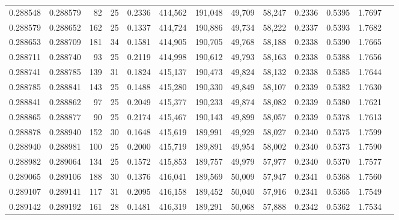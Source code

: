 \begin{tabular}{rrrrrrrrrrrrr}
0.288548 & 0.288579 &    82 &  25 &                                     0.2336 & 414,562 & 191,048 &  49,709 &  58,247 & 0.2336 & 0.5395 & 1.7697 \\
0.288579 & 0.288652 &   162 &  25 &                                     0.1337 & 414,724 & 190,886 &  49,734 &  58,222 & 0.2337 & 0.5393 & 1.7682 \\
0.288653 & 0.288709 &   181 &  34 &                                     0.1581 & 414,905 & 190,705 &  49,768 &  58,188 & 0.2338 & 0.5390 & 1.7665 \\
0.288711 & 0.288740 &    93 &  25 &                                     0.2119 & 414,998 & 190,612 &  49,793 &  58,163 & 0.2338 & 0.5388 & 1.7656 \\
0.288741 & 0.288785 &   139 &  31 &                                     0.1824 & 415,137 & 190,473 &  49,824 &  58,132 & 0.2338 & 0.5385 & 1.7644 \\
0.288785 & 0.288841 &   143 &  25 &                                     0.1488 & 415,280 & 190,330 &  49,849 &  58,107 & 0.2339 & 0.5382 & 1.7630 \\
0.288841 & 0.288862 &    97 &  25 &                                     0.2049 & 415,377 & 190,233 &  49,874 &  58,082 & 0.2339 & 0.5380 & 1.7621 \\
0.288865 & 0.288877 &    90 &  25 &                                     0.2174 & 415,467 & 190,143 &  49,899 &  58,057 & 0.2339 & 0.5378 & 1.7613 \\
0.288878 & 0.288940 &   152 &  30 &                                     0.1648 & 415,619 & 189,991 &  49,929 &  58,027 & 0.2340 & 0.5375 & 1.7599 \\
0.288940 & 0.288981 &   100 &  25 &                                     0.2000 & 415,719 & 189,891 &  49,954 &  58,002 & 0.2340 & 0.5373 & 1.7590 \\
0.288982 & 0.289064 &   134 &  25 &                                     0.1572 & 415,853 & 189,757 &  49,979 &  57,977 & 0.2340 & 0.5370 & 1.7577 \\
0.289065 & 0.289106 &   188 &  30 &                                     0.1376 & 416,041 & 189,569 &  50,009 &  57,947 & 0.2341 & 0.5368 & 1.7560 \\
0.289107 & 0.289141 &   117 &  31 &                                     0.2095 & 416,158 & 189,452 &  50,040 &  57,916 & 0.2341 & 0.5365 & 1.7549 \\
0.289142 & 0.289192 &   161 &  28 &                                     0.1481 & 416,319 & 189,291 &  50,068 &  57,888 & 0.2342 & 0.5362 & 1.7534 \\

\end{tabular}
